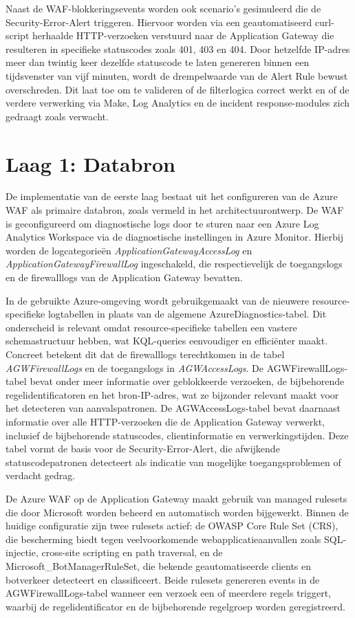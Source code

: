 Naast de WAF-blokkeringsevents worden ook scenario's gesimuleerd die de Security-Error-Alert triggeren. Hiervoor worden via een geautomatiseerd curl-script herhaalde HTTP-verzoeken verstuurd naar de Application Gateway die resulteren in specifieke statuscodes zoals 401, 403 en 404. Door hetzelfde IP-adres meer dan twintig keer dezelfde statuscode te laten genereren binnen een tijdsvenster van vijf minuten, wordt de drempelwaarde van de Alert Rule bewust overschreden. Dit laat toe om te valideren of de filterlogica correct werkt en of de verdere verwerking via Make, Log Analytics en de incident response-modules zich gedraagt zoals verwacht.


\section{Laag 1: Databron}
De implementatie van de eerste laag bestaat uit het configureren van de Azure WAF als primaire databron, zoals vermeld in het architectuurontwerp. De WAF is geconfigureerd om diagnostische logs door te sturen naar een Azure Log Analytics Workspace via de diagnostische instellingen in Azure Monitor. Hierbij worden de logcategorieën \textit{ApplicationGatewayAccessLog} en \textit{ApplicationGatewayFirewallLog} ingeschakeld, die respectievelijk de toegangslogs en de firewalllogs van de Application Gateway bevatten.

In de gebruikte Azure-omgeving wordt gebruikgemaakt van de nieuwere resource-specifieke logtabellen in plaats van de algemene AzureDiagnostics-tabel. Dit onderscheid is relevant omdat resource-specifieke tabellen een vastere schemastructuur hebben, wat KQL-queries eenvoudiger en efficiënter maakt. Concreet betekent dit dat de firewalllogs terechtkomen in de tabel \textit{AGWFirewallLogs} en de toegangslogs in \textit{AGWAccessLogs}. De AGWFirewallLogs-tabel bevat onder meer informatie over geblokkeerde verzoeken, de bijbehorende regelidentificatoren en het bron-IP-adres, wat ze bijzonder relevant maakt voor het detecteren van aanvalspatronen. De AGWAccessLogs-tabel bevat daarnaast informatie over alle HTTP-verzoeken die de Application Gateway verwerkt, inclusief de bijbehorende statuscodes, clientinformatie en verwerkingstijden. Deze tabel vormt de basis voor de Security-Error-Alert, die afwijkende statuscodepatronen detecteert als indicatie van mogelijke toegangsproblemen of verdacht gedrag.

De Azure WAF op de Application Gateway maakt gebruik van managed rulesets die door Microsoft worden beheerd en automatisch worden bijgewerkt. Binnen de huidige configuratie zijn twee rulesets actief: de OWASP Core Rule Set (CRS), die bescherming biedt tegen veelvoorkomende webapplicatieaanvallen zoals SQL-injectie, cross-site scripting en path traversal, en de Microsoft\_BotManagerRuleSet, die bekende geautomatiseerde clients en botverkeer detecteert en classificeert. Beide rulesets genereren events in de AGWFirewallLogs-tabel wanneer een verzoek een of meerdere regels triggert, waarbij de regelidentificator en de bijbehorende regelgroep worden geregistreerd.


